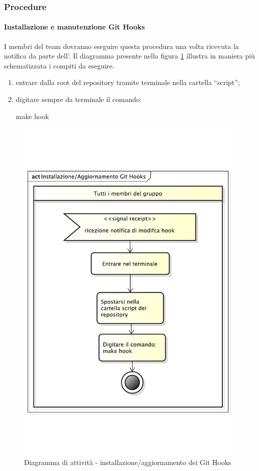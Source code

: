 				
		\subsubsection{Procedure}
			\paragraph{Installazione e manutenzione Git Hooks}
			\label{sec:installazione_git_hooks}
			I membri del team dovranno eseguire questa procedura una volta ricevuta la notifica da parte dell'\roleAdministrator. \newline
			Il diagramma presente nella figura \ref{fig:installazione_git_hook} illustra in maniera più schematizzata i compiti da eseguire.
				\begin{enumerate}
					\item entrare dalla root del repository tramite terminale nella cartella ``script'';
					\item digitare sempre da terminale il comando:
						\begin{center}
							make hook
						\end{center}
				\end{enumerate}
						
			\begin{figure}[htbp]
				\centering
				\includegraphics[width=11cm]{images/inst_git_hook.pdf}
				\caption{Diagramma di attività - installazione/aggiornamento dei Git Hooks}
				\label{fig:installazione_git_hook}
			\end{figure}
			
